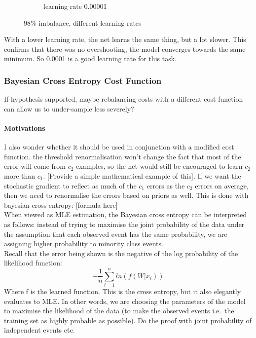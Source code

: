\documentclass[a4paper,11pt]{article}
\begin{document}
\begin{figure}
\begin{minipage}[b]{\textwidth}
\begin{subfigure}{.5\textwidth}
        \caption{learning rate 0.00001}\label{fig:2b}
      \end{subfigure} \par \vspace*{20pt} %
      \caption{98\% imbalance, different learning rates}\label{fig:2}
    \end{minipage}%
\end{figure}

With a lower learning rate, the net learns the same thing, but a lot slower. This confirms that there was no overshooting, the model converges towards the same minimum. So 0.0001 is a good learning rate for this task. \\


\subsubsection{Bayesian Cross Entropy Cost Function}

If hypothesis supported, maybe rebalancing costs with a different cost function can allow us to under-sample less severely? \\


\paragraph{Motivations}

I also wonder whether it should be used in conjunction with a modified cost function. the threshold renormalisation won't change the fact that most of the error will come from $c_2$ examples, so the net would still be encouraged to learn $c_2$ more than $c_1$. [Provide a simple mathematical example of this]. If we want the stochastic gradient to reflect as much of the $c_1$ errors as the $c_2$ errors on average, then we need to renormalise the errors based on priors as well. This is done with bayesian cross entropy: [formula here] \\

When viewed as MLE estimation, the Bayesian cross entropy can be interpreted as follows: instead of trying to maximise the joint probability of the data under the assumption that each observed event has the same probability, we are assigning higher probability to minority class events. \\

Recall that the error being shown is the negative of the log probability of the likelihood function:
\begin{equation}
-\frac{1}{n}\sum\limits_{i=1}^n ln(f(W|x_i))
\end{equation}
Where f is the learned function. This is the cross entropy, but it also elegantly evaluates to MLE. In other words, we are choosing the parameters of the model to maximise the likelihood of the data (to make the observed events i.e.\ the training set as highly probable as possible). Do the proof with joint probability of independent events etc. \\
\end{document}
